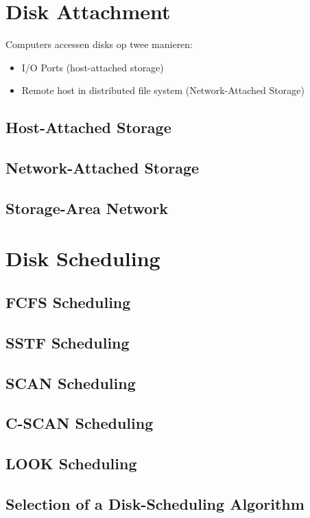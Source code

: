 \documentclass[12pt]{article}
\begin{document}
\section{Disk Attachment}
Computers accessen disks op twee manieren:
\begin{itemize}
	\item I/O Ports (host-attached storage)
	\item Remote host in distributed file system (Network-Attached Storage)
\end{itemize}
\subsection{Host-Attached Storage}
\subsection{Network-Attached Storage}
\subsection{Storage-Area Network}
\section{Disk Scheduling}
\subsection{FCFS Scheduling}

\subsection{SSTF Scheduling}
\subsection{SCAN Scheduling}
\subsection{C-SCAN Scheduling}
\subsection{LOOK Scheduling}
\subsection{Selection of a Disk-Scheduling Algorithm}
\end{document}
